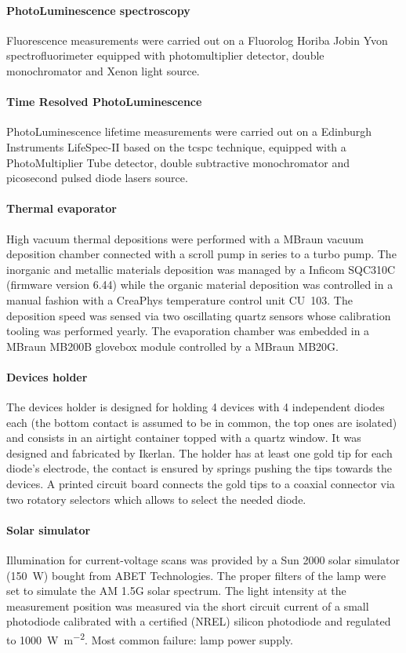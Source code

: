 	\paragraph{PhotoLuminescence spectroscopy} Fluorescence measurements were carried out on a Fluorolog Horiba Jobin Yvon spectrofluorimeter equipped with photomultiplier detector, double monochromator and	Xenon light source.

	\paragraph{Time Resolved PhotoLuminescence} PhotoLuminescence lifetime measurements were carried out on a Edinburgh Instruments LifeSpec-II based on the \gls{tcspc} technique, equipped with a PhotoMultiplier Tube detector, double subtractive monochromator and picosecond pulsed diode lasers source.
	
	\paragraph{Thermal evaporator} High vacuum thermal depositions were performed with a MBraun vacuum deposition chamber connected with a scroll pump in series to a turbo pump. The inorganic and metallic materials deposition was managed by a Inficom SQC310C (firmware version 6.44) while the organic material deposition was controlled in a manual fashion with a CreaPhys temperature control unit CU~103. The deposition speed was sensed via two oscillating quartz sensors whose calibration tooling was performed yearly. The evaporation chamber was embedded in a MBraun MB200B glovebox module controlled by a MBraun MB20G.

	\paragraph{Devices holder} The devices holder is designed for holding 4 devices with 4 independent diodes each (the bottom contact is assumed to be in common, the top ones are isolated) and consists in an airtight container topped with a quartz window. It was designed and fabricated by Ikerlan. The holder has at least one gold tip for each diode's electrode, the contact is ensured by springs pushing the tips towards the devices. A printed circuit board connects the gold tips to a coaxial connector via two rotatory selectors which allows to select the needed diode.

	\paragraph{Solar simulator}\label{solarsimulator}Illumination for current-voltage scans was provided by a Sun 2000 solar simulator (\SI{150}{\W}) bought from ABET Technologies. The proper filters of the lamp were set to simulate the AM 1.5G solar spectrum. The light intensity at the measurement position was measured via the short circuit current of a small photodiode calibrated with a certified (NREL) silicon photodiode and regulated to \SI{1000}{\W\per\m\squared}. Most common failure: lamp power supply.

